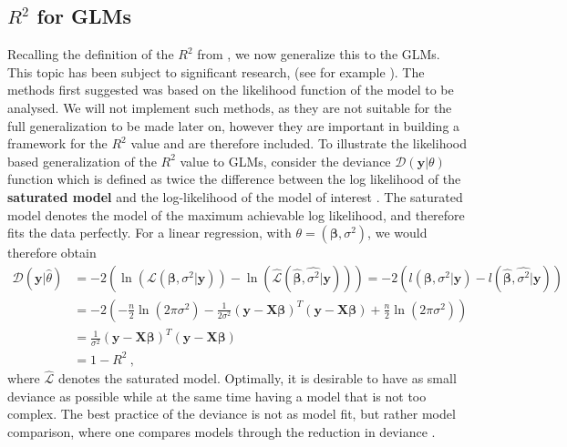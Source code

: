 \subsection{\texorpdfstring{$R^2$}{Lg} for GLMs}
Recalling the definition of the $R^2$ from , we now generalize this to the GLMs. This topic has been subject to significant research, (see for example \citet{maddala1983limited, cameron1997r, menard2000coefficients,  nakagawa2013general}). The methods first suggested was based on the likelihood function of the model to be analysed. We will not implement such methods, as they are not suitable for the full generalization to be made later on, however they are important in building a framework for the $R^2$ value and are therefore included.
To illustrate the likelihood based generalization of the $R^2$ value to GLMs, consider the deviance $\mathcal{D}(\mathbf{y}\lvert \theta)$ function which is defined as twice the difference between the log likelihood of the \textbf{saturated model} and the log-likelihood of the model of interest \citep{GLMM_book_old}.
The saturated model denotes the model of the maximum achievable log likelihood, and therefore fits the data perfectly. 
For a linear regression, with $\theta=(\boldsymbol{\beta}, \sigma^2)$, we would therefore obtain
\begin{equation}
    \begin{aligned}
    \mathcal{D}(\mathbf{y}\lvert \hat{\theta}) &= -2\left( \ln(\mathcal{L}(\boldsymbol{\beta}, \sigma^2 \lvert \mathbf{y})) - \ln(\mathcal{\hat{L}}(\boldsymbol{\hat{\beta}}, \hat{\sigma^2} \lvert \mathbf{y}))  \right) = -2\left( l(\boldsymbol{\beta}, \sigma^2 \lvert \mathbf{y}) - l(\boldsymbol{\hat{\beta}}, \hat{\sigma^2} \lvert \mathbf{y})  \right) \\
    & = -2\left(-\frac{n}{2}\ln(2\pi\sigma^2) - \frac{1}{2\sigma^2} (\mathbf{y}-\mathbf{X}\boldsymbol{\beta})^T(\mathbf{y}-\mathbf{X}\boldsymbol{\beta}) + \frac{n}{2}\ln(2\pi\sigma^2)  \right) \\
    & = \frac{1}{\sigma^2} (\mathbf{y}-\mathbf{X}\boldsymbol{\beta})^T(\mathbf{y}-\mathbf{X}\boldsymbol{\beta}) \\
    & = 1-R^2 \ ,
    \end{aligned}
\end{equation}
where $\mathcal{\hat{L}}$ denotes the saturated model.
Optimally, it is desirable to have as small deviance as possible while at the same time having a model that is not too complex.
The best practice of the deviance is not as model fit, but rather model comparison, where one compares models through the reduction in deviance \citep{GLMM_book_old}.
